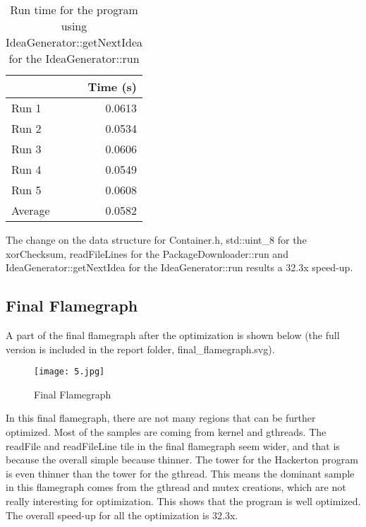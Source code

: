 \documentclass[12pt]{article}
\begin{document}
\begin{table}[H]
  \centering
  \begin{tabular}{lr}
    & {\bf Time (s)} \\
    \hline
    Run 1 & 0.0613 \\
    Run 2 & 0.0534 \\
    Run 3 & 0.0606 \\
    Run 4 & 0.0549 \\
    Run 5 & 0.0608 \\
    \hline
    Average & 0.0582 \\
  \end{tabular}
  \caption{Run time for the program using IdeaGenerator::getNextIdea for the IdeaGenerator::run}
  \label{tbl-fib-sequential}
\end{table}

\noindent 
The change on the data structure for Container.h, std::uint\_8 for the xorChecksum, readFileLines for the PackageDownloader::run and IdeaGenerator::getNextIdea for the IdeaGenerator::run results a 32.3x speed-up. 

\newpage
\subsection{Final Flamegraph}
A part of the final flamegraph after the optimization is shown below (the full version is included in the report folder, final\_flamegraph.svg).

\begin{figure}[htb!]
  \centering
  \texttt{[image: 5.jpg]}
  \caption{Final Flamegraph}
\end{figure}

\noindent 
In this final flamegraph, there are not many regions that can be further optimized. Most of the samples are coming from kernel and gthreads. The readFile and readFileLine tile in the final flamegraph seem wider, and that is because the overall simple because thinner. The tower for the Hackerton program is even thinner than the tower for the gthread. This means the dominant sample in this flamegraph comes from the gthread and mutex creations, which are not really interesting for optimization. This shows that the program is well optimized. The overall speed-up for all the optimization is 32.3x. 
\end{document}
